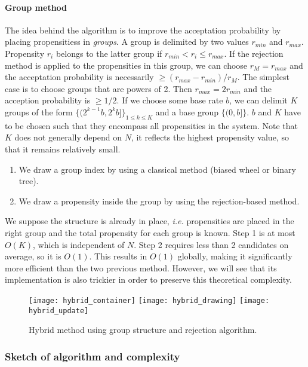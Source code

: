  \paragraph{Group method} The idea behind the algorithm is to improve the acceptation probability by placing propensitiess in \emph{groups}. A group is delimited by two values $r_{min}$ and $r_{max}$. Propensity $r_i$ belongs to the latter group if $r_{min} < r_i \leq r_{max}$. If the rejection method is applied to the propensities in this group, we can choose $r_M = r_{max}$ and the acceptation probability is necessarily $\geq (r_{max}-r_{min})/r_M$. The simplest case is to choose groups that are powers of 2. Then $r_{max} = 2r_{min}$ and the acception probability is $\geq 1/2$. If we choose some base rate $b$, we can delimit $K$ groups of the form $\{(2^{k-1}b, 2^kb]\}_{1\leq k \leq K}$ and a base group $\{(0, b]\}$. $b$ and $K$ have to be chosen such that they encompass all propensities in the system. Note that $K$ does not generally depend on $N$, it reflects the highest propensity value, so that it remains relatively small.
\begin{enumerate}
\item We draw a group index by using a classical method (biased wheel or binary tree).
\item We draw a propensity inside the group by using the rejection-based method.
\end{enumerate}
We suppose the structure is already in place, \textit{i.e.} propensities are placed in the right group and the total propensity for each group is known. Step 1 is at most $O(K)$, which is independent of $N$. Step 2 requires less than 2 candidates on average, so it is $O(1)$. This results in $O(1)$ globally, making it significantly more efficient than the two previous method. However, we will see that its implementation is also trickier in order to preserve this theoretical complexity.

\begin{figure}[!h]
  \centering
  \texttt{[image: hybrid\_container]}
  \texttt{[image: hybrid\_drawing]}
  \texttt{[image: hybrid\_update]}
  \caption {Hybrid method using group structure and rejection algorithm.}
  \label {fig:hybrid_method}
\end {figure}

\subsubsection {Sketch of algorithm and complexity} 

